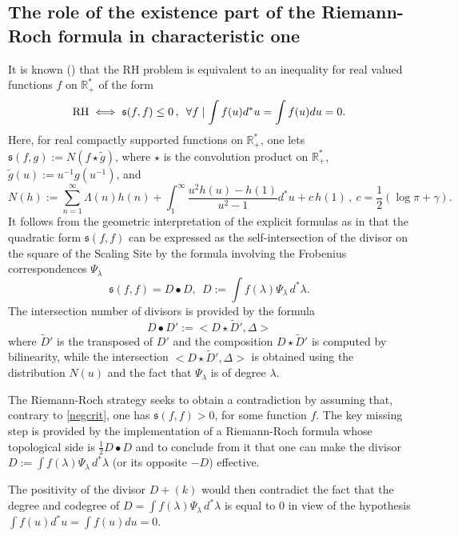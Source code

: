 \documentclass[graybox, envcountsect%
]{svmult}
\def\inter{{\mathfrak s}}
\def\R{{\mathbb R}}
\def\qqq{\,,\,~\forall}
\def\no{\noindent}
\begin{document}
\subsection{The role of the existence  part of the Riemann-Roch formula in characteristic one}\label{subsec:3.1} 

It is known (\cite{B3}) that the  RH problem is equivalent to an inequality for real valued functions $f$ on $\R_+^*$ of the form 
\begin{equation}\label{negcrit}
{\rm RH} \iff \inter(f,f)\leq 0 \qqq f \mid \int f(u)d^*u=\int f(u)du=0.
\end{equation}
Here, for real compactly supported functions on $\R_+^*$, one lets $\inter(f,g):=N(f\star \tilde g)$, where $\star$ is the convolution product on $\R_+^*$,  $\tilde g(u):=u^{-1}g(u^{-1})$, and
\begin{equation}\label{negcrit1}
N(h):= \sum_{n=1}^\infty \Lambda(n)h(n)+ \int_1^\infty\frac{u^2h(u)-h(1)}{u^2-1}d^*u+c\, h(1)\,, \ c=\frac12(\log\pi+\gamma).
\end{equation}
It follows from the geometric interpretation of the explicit formulas as in \cite{CC0.5} that  the quadratic form $\inter(f,f)$ can be expressed as the self-intersection of the divisor on the square of the Scaling Site by the formula involving the Frobenius correspondences $\Psi_{\lambda}$ 
\begin{equation}\label{negcrit1bis}
\inter(f,f)=D\bullet D, \ \ D:=\int f(\lambda) \Psi_{\lambda}\, d^*\lambda.
\end{equation}
The intersection number of divisors is provided by the formula
$$
D\bullet D':=<D\star\tilde D',\Delta>
$$
where $\tilde D'$ is the transposed of $D'$ and the composition $D\star\tilde D'$ is computed by bilinearity, while the intersection $<D\star\tilde D',\Delta>$ is obtained using the distribution $N(u)$ and the fact that $\Psi_{\lambda}$ is of degree $\lambda$.

\no The Riemann-Roch strategy seeks to obtain a contradiction by assuming that, contrary to \eqref{negcrit}, one has 
 $\inter(f,f)>0$, for some function $f$. The key missing step is provided by the implementation of a Riemann-Roch formula whose topological side is $\frac 12 D\bullet D$ and to conclude from it that one can make the divisor $ D:=\int f(\lambda) \Psi_{\lambda}\, d^*\lambda$ (or its opposite $-D$) effective. 

\no The positivity of the divisor $D+(k)$ would then contradict the fact that the degree and codegree of $D=\int f(\lambda) \Psi_{\lambda}\, d^*\lambda$ is equal to $0$ in view of the hypothesis $\int f(u)d^*u=\int f(u)du=0$. 
 
\end{document}

